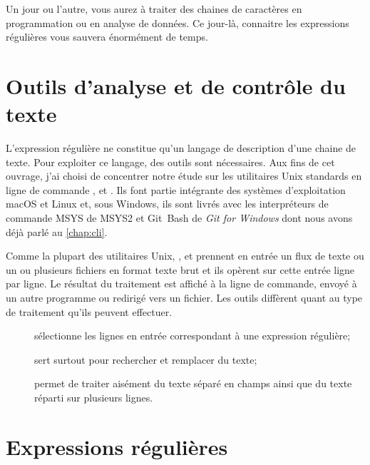 Un jour ou l'autre, vous aurez à traiter des chaines de caractères en
programmation ou en analyse de données. Ce jour-là, connaitre les
expressions régulières vous sauvera énormément de temps.


\section{Outils d'analyse et de contrôle du texte}
\label{sec:texte:outils}

L'expression régulière ne constitue qu'un langage de description d'une
chaine de texte. Pour exploiter ce langage, des outils sont
nécessaires. Aux fins de cet ouvrage, j'ai choisi de concentrer notre
étude sur les utilitaires Unix standards en ligne de commande
,  et . Ils font partie intégrante des
systèmes d'exploitation macOS et Linux et, sous Windows, ils sont
livrés avec les interpréteurs de commande MSYS de MSYS2
et Git~Bash de \emph{Git for Windows} dont nous avons
déjà parlé au \autoref{chap:cli}.

Comme la plupart des utilitaires Unix, ,  et
 prennent en entrée un flux de texte ou un ou plusieurs
fichiers en format texte brut et ils opèrent sur cette entrée ligne
par ligne. Le résultat du traitement est affiché à la ligne de
commande, envoyé à un autre programme ou redirigé vers un fichier. Les
outils diffèrent quant au type de traitement qu'ils peuvent effectuer.
\begin{description}
\item[] sélectionne les lignes en entrée correspondant à
  une expression régulière;
\item[] sert surtout pour rechercher et remplacer du texte;
\item[] permet de traiter aisément du texte séparé en champs
  ainsi que du texte réparti sur plusieurs lignes.
\end{description}



\section{Expressions régulières}
\label{sec:texte:regex}

